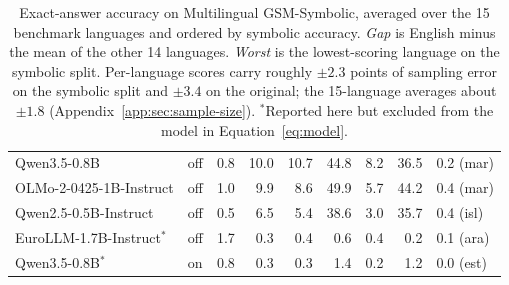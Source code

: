 \begin{table}[p]
\begin{tabular}{llrrrrrrl}
Qwen3.5-0.8B & off & 0.8 & 10.0 & 10.7 & 44.8 & 8.2 & 36.5 & 0.2 (mar) \\
OLMo-2-0425-1B-Instruct & off & 1.0 & 9.9 & 8.6 & 49.9 & 5.7 & 44.2 & 0.4 (mar) \\
Qwen2.5-0.5B-Instruct & off & 0.5 & 6.5 & 5.4 & 38.6 & 3.0 & 35.7 & 0.4 (isl) \\
EuroLLM-1.7B-Instruct$^{*}$ & off & 1.7 & 0.3 & 0.4 & 0.6 & 0.4 & 0.2 & 0.1 (ara) \\
Qwen3.5-0.8B$^{*}$ & on & 0.8 & 0.3 & 0.3 & 1.4 & 0.2 & 1.2 & 0.0 (est) \\
\bottomrule
\end{tabular}
\caption{Exact-answer accuracy on Multilingual GSM-Symbolic, averaged over the 15 benchmark languages and ordered by symbolic accuracy. \emph{Gap} is English minus the mean of the other 14 languages. \emph{Worst} is the lowest-scoring language on the symbolic split. Per-language scores carry roughly $\pm 2.3$ points of sampling error on the symbolic split and $\pm 3.4$ on the original; the 15-language averages about $\pm 1.8$ (Appendix~\ref{app:sec:sample-size}). $^{*}$Reported here but excluded from the model in Equation~\ref{eq:model}.}
\label{tab:leaderboard}
\end{table}
